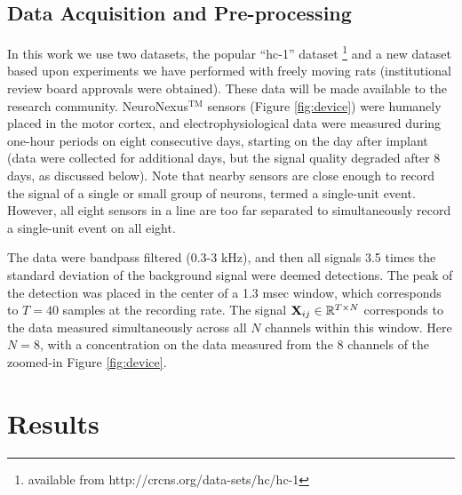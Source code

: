 \documentclass[journal]{IEEEtran}
\newcommand{\jovo}[1]{{\color{magenta}{\it #1}}}
\begin{document}
\subsection{Data Acquisition and Pre-processing} %
\label{sub:data_acquisition_and_pre_processing}


In this work we use two datasets, the popular ``hc-1'' dataset
\footnote{available from http://crcns.org/data-sets/hc/hc-1} and a new dataset based upon experiments we have performed with freely moving rats (institutional review board approvals were obtained). These data will be made available to the research community. NeuroNexus$^{\mbox{TM}}$ sensors (Figure \ref{fig:device}) were humanely placed in the motor cortex, and electrophysiological data were measured during one-hour periods on eight consecutive days, starting on the day after implant (data were collected for additional days, but the signal quality degraded after 8 days, as discussed below). Note that nearby sensors are close enough to record the signal of a single or small group of neurons, termed a single-unit event. However, all eight sensors in a line are too far separated to simultaneously record a single-unit event on all eight.


The data were bandpass filtered (0.3-3 kHz), and
then all signals 3.5 times the standard deviation of the background
signal were deemed detections. The peak of the detection was placed
in the center of a 1.3 msec window, which corresponds to $T=40$
samples at the recording rate. The signal
${\mathbf X}_{ij}\in\mathbb{R}^{T\times N}$ corresponds to the data
measured simultaneously across all $N$ channels within this window.
Here $N=8$, with a concentration on the data measured from the 8
channels of the zoomed-in Figure \ref{fig:device}.


 \jovo{seems like one of the reviewers wants more details here.  i don't have them though. DEC has emailed colin, i believe, to get them.}


\section{Results\label{sec:results}}
\end{document}
